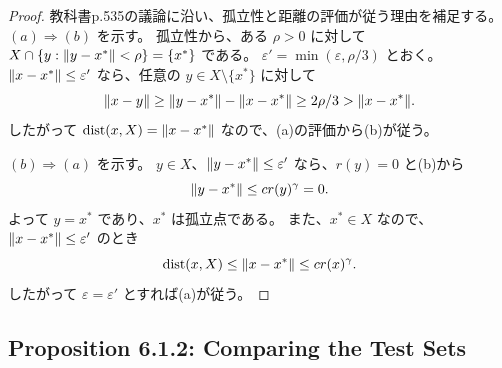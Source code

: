 \documentclass[12pt,dvipdfmx]{article}
\theoremstyle{plain}
\begin{document}
\begin{proof}
    教科書p.535の議論に沿い、孤立性と距離の評価が従う理由を補足する。
    $(a) \Rightarrow (b)$ を示す。
    孤立性から、ある $\rho > 0$ に対して
    $X \cap \{y : \norm{y - x^*} < \rho\} = \{x^*\}$ である。
    $\varepsilon' = \min(\varepsilon, \rho/3)$ とおく。
    $\norm{x - x^*} \leq \varepsilon'$ なら、任意の $y \in X \setminus \{x^*\}$ に対して
    \begin{equation*}
        \norm{x - y} \geq \norm{y - x^*} - \norm{x - x^*}
        \geq 2\rho/3 > \norm{x - x^*}.
    \end{equation*}
    したがって $\operatorname{dist}(x, X) = \norm{x - x^*}$ なので、(a)の評価から(b)が従う。

    $(b) \Rightarrow (a)$ を示す。
    $y \in X$、$\norm{y - x^*} \leq \varepsilon'$ なら、$r(y) = 0$ と(b)から
    \begin{equation*}
        \norm{y - x^*} \leq c r(y)^\gamma = 0.
    \end{equation*}
    よって $y = x^*$ であり、$x^*$ は孤立点である。
    また、$x^* \in X$ なので、$\norm{x - x^*} \leq \varepsilon'$ のとき
    \begin{equation*}
        \operatorname{dist}(x, X) \leq \norm{x - x^*} \leq c r(x)^\gamma.
    \end{equation*}
    したがって $\varepsilon = \varepsilon'$ とすれば(a)が従う。
\end{proof}

\subsection{Proposition 6.1.2: Comparing the Test Sets}
\label{sec:error-comparison}

\end{document}
